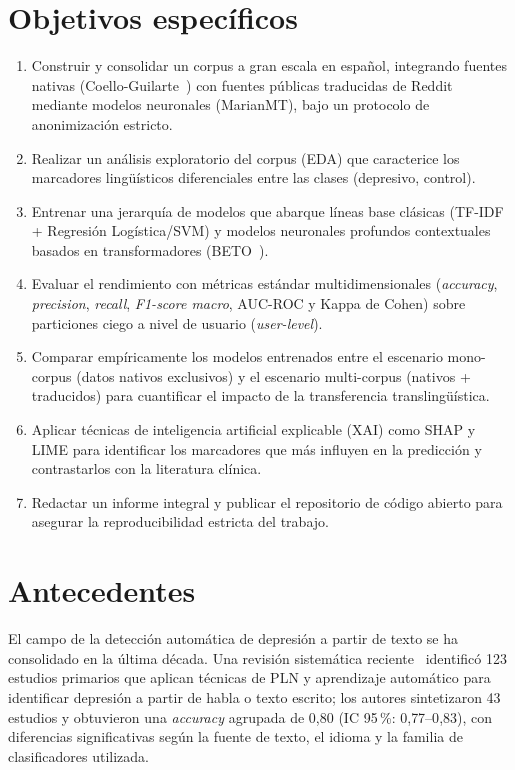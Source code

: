 \documentclass[12pt,a4paper,spanish]{article}
\begin{document}
\newpage
\section{Objetivos específicos}

\begin{enumerate}[leftmargin=2em]
    \item Construir y consolidar un corpus a gran escala en español, integrando fuentes nativas (Coello-Guilarte~\cite{coello2019}) con fuentes públicas traducidas de Reddit mediante modelos neuronales (MarianMT), bajo un protocolo de anonimización estricto.
    \item Realizar un análisis exploratorio del corpus (EDA) que caracterice los marcadores lingüísticos diferenciales entre las clases (depresivo, control).
    \item Entrenar una jerarquía de modelos que abarque líneas base clásicas (TF-IDF + Regresión Logística/SVM) y modelos neuronales profundos contextuales basados en transformadores (BETO~\cite{betohf}).
    \item Evaluar el rendimiento con métricas estándar multidimensionales (\emph{accuracy}, \emph{precision}, \emph{recall}, \emph{F1-score macro}, AUC-ROC y Kappa de Cohen) sobre particiones ciego a nivel de usuario (\emph{user-level}).
    \item Comparar empíricamente los modelos entrenados entre el escenario mono-corpus (datos nativos exclusivos) y el escenario multi-corpus (nativos + traducidos) para cuantificar el impacto de la transferencia translingüística.
    \item Aplicar técnicas de inteligencia artificial explicable (XAI) como SHAP y LIME para identificar los marcadores que más influyen en la predicción y contrastarlos con la literatura clínica.
    \item Redactar un informe integral y publicar el repositorio de código abierto para asegurar la reproducibilidad estricta del trabajo.
\end{enumerate}

\section{Antecedentes}

El campo de la detección automática de depresión a partir de texto se ha consolidado en la última década. Una revisión sistemática reciente~\cite{nature2026review} identificó 123 estudios primarios que aplican técnicas de PLN y aprendizaje automático para identificar depresión a partir de habla o texto escrito; los autores sintetizaron 43 estudios y obtuvieron una \emph{accuracy} agrupada de 0{,}80 (IC 95\,\%: 0{,}77--0{,}83), con diferencias significativas según la fuente de texto, el idioma y la familia de clasificadores utilizada.
\end{document}
